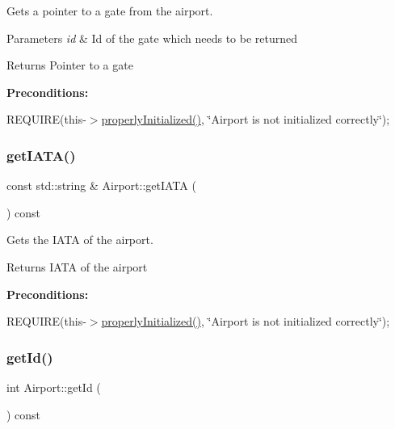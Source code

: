 Gets a pointer to a gate from the airport. 


\begin{DoxyParams}{Parameters}
{\em id} & Id of the gate which needs to be returned \\
\hline
\end{DoxyParams}
\begin{DoxyReturn}{Returns}
Pointer to a gate
\end{DoxyReturn}
{\bfseries Preconditions\+:}
\begin{DoxyItemize}
\item R\+E\+Q\+U\+I\+RE(this-\/$>$\mbox{\hyperlink{class_airport_aa13e68ac58e8875837fbe888325cfff6}{properly\+Initialized()}}, \char`\"{}\+Airport is not initialized correctly\char`\"{}); 
\end{DoxyItemize}\mbox{\label{class_airport_aa127b88a8221fa23977c4fa6e37eee5b}} 
\subsubsection{\texorpdfstring{get\+I\+A\+T\+A()}{getIATA()}}
{\footnotesize\ttfamily const std\+::string \& Airport\+::get\+I\+A\+TA (\begin{DoxyParamCaption}{ }\end{DoxyParamCaption}) const}



Gets the I\+A\+TA of the airport. 

\begin{DoxyReturn}{Returns}
I\+A\+TA of the airport
\end{DoxyReturn}
{\bfseries Preconditions\+:}
\begin{DoxyItemize}
\item R\+E\+Q\+U\+I\+RE(this-\/$>$\mbox{\hyperlink{class_airport_aa13e68ac58e8875837fbe888325cfff6}{properly\+Initialized()}}, \char`\"{}\+Airport is not initialized correctly\char`\"{}); 
\end{DoxyItemize}\mbox{\label{class_airport_ab7f1095f9c7bf4940bd5b375fa8a5fc4}} 
\subsubsection{\texorpdfstring{get\+Id()}{getId()}}
{\footnotesize\ttfamily int Airport\+::get\+Id (\begin{DoxyParamCaption}{ }\end{DoxyParamCaption}) const}



